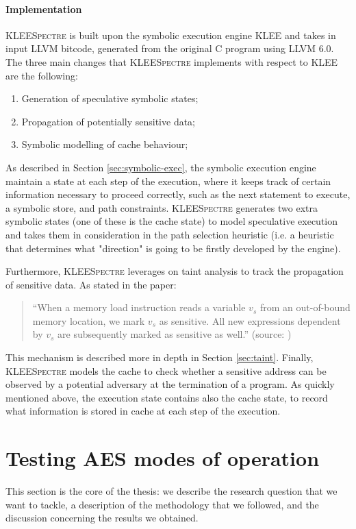 \documentclass[target=mst,aauheader=aics]{thud}
\theoremstyle{definition}
\begin{document}
	\paragraph{Implementation} \textsc{KLEESpectre} is built upon the symbolic execution engine \textsc{KLEE} \cite{Cadar2008} and takes in input LLVM bitcode, generated from the original C program using LLVM 6.0. The three main changes that \textsc{KLEESpectre} implements with respect to \textsc{KLEE} are the following:
	\begin{enumerate}
		\item Generation of speculative symbolic states;
		\item Propagation of potentially sensitive data;
		\item Symbolic modelling of cache behaviour;
	\end{enumerate}
	As described in Section \ref{sec:symbolic-exec}, the symbolic execution engine maintain a state at each step of the execution, where it keeps track of certain information necessary to proceed correctly, such as the next statement to execute, a symbolic store, and path constraints. \textsc{KLEESpectre} generates two extra symbolic states (one of these is the cache state) to model speculative execution and takes them in consideration in the path selection heuristic (i.e. a heuristic that determines what "direction" is going to be firstly developed by the engine).
	
	Furthermore, \textsc{KLEESpectre} leverages on taint analysis to track the propagation of sensitive data. As stated in the paper:
	\begin{quote}
		``When a memory load instruction reads a variable $v_s$ from an out-of-bound memory location, we mark $v_s$ as sensitive. All new expressions dependent by $v_s$ are subsequently marked as sensitive as well.'' (source: \cite{Wang2020})
	\end{quote} 
	This mechanism is described more in depth in Section \ref{sec:taint}. Finally, \textsc{KLEESpectre} models the cache to check whether a sensitive address can be observed by a potential adversary at the termination of a program. As quickly mentioned above, the execution state contains also the cache state, to record what information is stored in cache at each step of the execution.
	
	\section{Testing AES modes of operation}\label{sec:testing}
	This section is the core of the thesis: we describe the research question that we want to tackle, a description of the methodology that we followed, and the discussion concerning the results we obtained.
	
\end{document}
